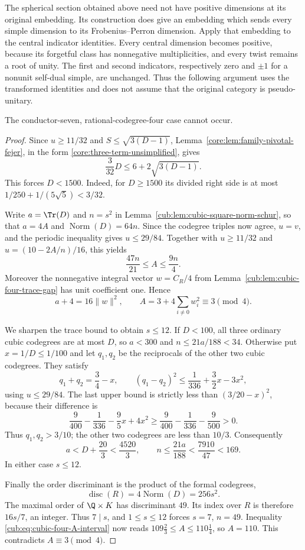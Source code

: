 The spherical section obtained above need not have positive dimensions
at its original embedding. Its construction does give an embedding
which sends every simple dimension to its Frobenius--Perron dimension.
Apply that embedding to the central indicator identities. Every central
dimension becomes positive, because its forgetful class has nonnegative
multiplicities, and every twist remains a root of unity. The first and
second indicators, respectively zero and $\pm1$ for a nonunit self-dual
simple, are unchanged. Thus the following argument uses the transformed
identities and does not assume that the original category is
pseudo-unitary.



\begin{theorem}\label{cub:thm:cubic-seven-excluded}
The conductor-seven, rational-codegree-four case cannot occur.
\end{theorem}
\begin{proof}
Since $u\ge11/32$ and $S\le\sqrt{3(D-1)}$, Lemma~\ref{core:lem:family-pivotal-fejer}, in the form
\eqref{core:three-term-unsimplified}, gives
\[
 \frac3{32}D\le6+2\sqrt{3(D-1)}.
\]
This forces $D<1500$. Indeed, for $D\ge1500$ its divided right side
is at most $1/250+1/(5\sqrt5)<3/32$.

Write $a=\Tr(D)$ and $n=s^2$ in
Lemma~\ref{cub:lem:cubic-square-norm-schur}, so that $a=4A$ and
$\operatorname{Norm}(D)=64n$. Since the codegree triples now agree,
$u=v$, and the periodic inequality gives $u\le29/84$. Together with
$u\ge11/32$ and $u=(10-2A/n)/16$, this yields
\begin{equation}\label{cub:eq:cubic-four-A-interval}
 \frac{47n}{21}\le A\le\frac{9n}{4}.
\end{equation}
Moreover the nonnegative integral vector $w=C_R/4$ from
Lemma~\ref{cub:lem:cubic-four-trace-gap} has unit coefficient one. Hence
\[
 a+4=16\|w\|^2,
 \qquad A=3+4\sum_{i\ne0}w_i^2\equiv3\pmod4.
\]

We sharpen the trace bound to obtain $s\le12$. If $D<100$, all three
ordinary cubic codegrees are at most $D$, so $a<300$ and
$n\le21a/188<34$. Otherwise put $x=1/D\le1/100$ and let $q_1,q_2$
be the reciprocals of the other two cubic codegrees. They satisfy
\[
 q_1+q_2=\frac34-x,
 \qquad (q_1-q_2)^2\le\frac1{336}+\frac32x-3x^2,
\]
using $u\le29/84$. The last upper bound is strictly less than
$(3/20-x)^2$, because their difference is
\[
 \frac9{400}-\frac1{336}-\frac95x+4x^2
 \ge\frac9{400}-\frac1{336}-\frac9{500}>0.
\]
Thus $q_1,q_2>3/10$; the other two codegrees are less than $10/3$.
Consequently
\[
 a<D+\frac{20}{3}<\frac{4520}{3},
 \qquad n\le\frac{21a}{188}<\frac{7910}{47}<169.
\]
In either case $s\le12$.

Finally the order discriminant is the product of the formal codegrees,
\[
 \operatorname{disc}(R)=4\operatorname{Norm}(D)=256s^2.
\]
The maximal order of $\Q\times K$ has discriminant $49$. Its index
over $R$ is therefore $16s/7$, an integer. Thus $7\mid s$, and
$1\le s\le12$ forces $s=7$, $n=49$. Inequality
\eqref{cub:eq:cubic-four-A-interval} now reads
$109\tfrac23\le A\le110\tfrac14$, so $A=110$. This contradicts
$A\equiv3\pmod4$.
\end{proof}

